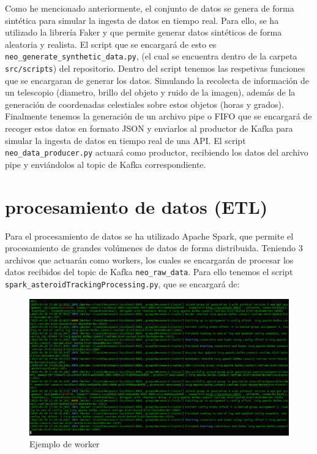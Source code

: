 \documentclass[12pt]{article}
\begin{document}
Como he mencionado anteriormente, el conjunto de datos se genera de forma sintética para simular la ingesta de datos en tiempo real.
Para ello, se ha utilizado la librería Faker \cite[Faker]{joke2k-faker} y \cite[numpy]{numpy} que permite generar datos sintéticos 
de forma aleatoria y realista. El script que se encargará de esto es \texttt{neo\_generate\_synthetic\_data.py}, (el cual se
encuentra dentro de la carpeta \texttt{src/scripts}) del repositorio. Dentro del script tenemos las respetivas funciones
que se encargaran de generar los datos. Simulando la recolecta de información de un telescopio (diametro, brillo del objeto y 
ruido de la imagen), además de la generación de coordenadas celestiales sobre estos objetos (horas y grados).
\\
Finalmente tenemos la generación de un archivo pipe o FIFO que se encargará de recoger estos datos en formato JSON y enviarlos 
al productor de Kafka para simular la ingesta de datos en tiempo real de una API. El script \texttt{neo\_data\_producer.py} 
actuará como productor, recibiendo los datos del archivo pipe y enviándolos al topic de Kafka correspondiente.

\section{procesamiento de datos (ETL)}

Para el procesamiento de datos se ha utilizado Apache Spark, que permite el procesamiento de grandes volúmenes de datos de 
forma distribuida. Teniendo 3 archivos que actuarán como workers, los cuales se encargarán de procesar los datos
recibidos del topic de Kafka \texttt{neo\_raw\_data}. Para ello tenemos el script \texttt{spark\_asteroidTrackingProcessing.py}, que se
encargará de:

\begin{figure}[h!]
    \centering
    \includegraphics[width=.7\textwidth]{assets/proyecto/worker1.PNG}
    \caption{Ejemplo de worker}
    \label{fig:my_label}
\end{figure}
\end{document}
